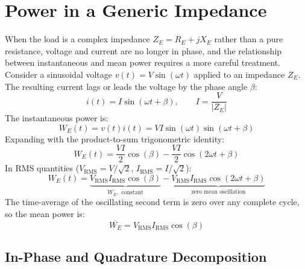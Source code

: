 \section{Power in a Generic Impedance}
\label{sc:52}

When the load is a complex impedance \(Z_E = R_E + jX_E\) rather than a pure resistance, voltage and current are no longer in phase, and the relationship between instantaneous and mean power requires a more careful treatment.
Consider a sinusoidal voltage \(v(t) = V\sin(\omega t)\) applied to an impedance \(Z_E\). The resulting current lags or leads the voltage by the phase angle \(\beta\):
\[
i(t) = I\sin(\omega t + \beta), \qquad I = \frac{V}{|Z_E|}
\]
The instantaneous power is:
\[
W_E(t) = v(t) i(t) = VI\sin(\omega t)\sin(\omega t + \beta)
\]
Expanding with the product-to-sum trigonometric identity:
\[
W_E(t) = \frac{VI}{2}\cos(\beta) - \frac{VI}{2}\cos(2\omega t + \beta)
\]
In RMS quantities (\(V_\mathrm{RMS} = V/\sqrt{2}\), \(I_\mathrm{RMS} = I/\sqrt{2}\)):
\[
W_E(t) = \underbrace{V_\mathrm{RMS} I_\mathrm{RMS}\cos(\beta)}_{\overline{W_E},\text{ constant}} - \underbrace{V_\mathrm{RMS} I_\mathrm{RMS}\cos(2\omega t + \beta)}_{\text{zero mean oscillation}}
\]
The time-average of the oscillating second term is zero over any complete cycle, so the mean power is:
\begin{equation}
    \overline{W_E} = V_\mathrm{RMS} I_\mathrm{RMS}\cos(\beta)
    \label{eq:meanPowerPhase}
\end{equation}

\subsection{In-Phase and Quadrature Decomposition}
\label{ssc:521}

